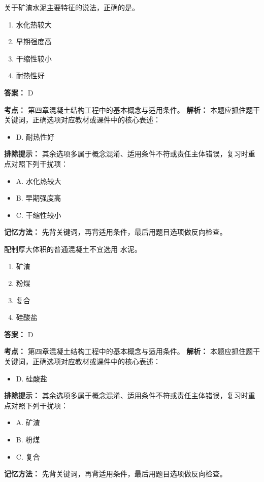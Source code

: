 \documentclass[UTF8,fontset=fandol,11pt]{ctexart}
\begin{document}
\vspace{0.2em}

\begin{quizbox}[title={第 48 题}]
关于矿渣水泥主要特征的说法，正确的是。\\
\begin{enumerate}[label=\Alph*.]
\item 水化热较大
\item 早期强度高
\item 干缩性较小
\item 耐热性好
\end{enumerate}
\textbf{答案：} D
\vspace{0.25em}
\begin{answerbox}[title={考点解析}]
\textbf{考点：} 第四章混凝土结构工程中的基本概念与适用条件。
\textbf{解析：} 本题应抓住题干关键词，正确选项对应教材或课件中的核心表述：
\begin{itemize}
\item D. 耐热性好
\end{itemize}
\textbf{排除提示：} 其余选项多属于概念混淆、适用条件不符或责任主体错误，复习时重点对照下列干扰项：
\begin{itemize}
\item A. 水化热较大
\item B. 早期强度高
\item C. 干缩性较小
\end{itemize}
\textbf{记忆方法：} 先背关键词，再背适用条件，最后用题目选项做反向检查。
\end{answerbox}
\end{quizbox}

\vspace{0.2em}

\begin{quizbox}[title={第 49 题}]
配制厚大体积的普通混凝土不宜选用 水泥。\\
\begin{enumerate}[label=\Alph*.]
\item 矿渣
\item 粉煤
\item 复合
\item 硅酸盐
\end{enumerate}
\textbf{答案：} D
\vspace{0.25em}
\begin{answerbox}[title={考点解析}]
\textbf{考点：} 第四章混凝土结构工程中的基本概念与适用条件。
\textbf{解析：} 本题应抓住题干关键词，正确选项对应教材或课件中的核心表述：
\begin{itemize}
\item D. 硅酸盐
\end{itemize}
\textbf{排除提示：} 其余选项多属于概念混淆、适用条件不符或责任主体错误，复习时重点对照下列干扰项：
\begin{itemize}
\item A. 矿渣
\item B. 粉煤
\item C. 复合
\end{itemize}
\textbf{记忆方法：} 先背关键词，再背适用条件，最后用题目选项做反向检查。
\end{answerbox}
\end{quizbox}
\end{document}
